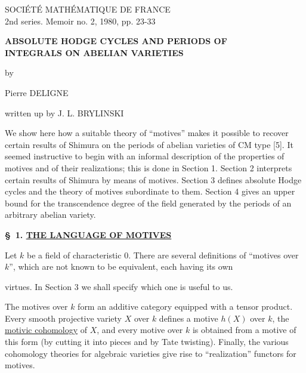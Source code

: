 \documentclass[10pt,a4paper]{article}
\begin{document}
\fontsize{8.65}{10.15}\selectfont
\sloppy

\begin{flushleft}\textsc{SOCIÉTÉ MATHÉMATIQUE DE FRANCE}\\
2nd series. Memoir no. 2, 1980, pp. 23-33
\end{flushleft}

\vspace{1.5em}
\begin{center}
{\bfseries ABSOLUTE HODGE CYCLES AND PERIODS OF\\[0.35em]
INTEGRALS ON ABELIAN VARIETIES}

\vspace{1.4em}
by

\vspace{1em}
Pierre DELIGNE

\vspace{0.5em}
written up by J. L. BRYLINSKI
\end{center}

\vspace{1em}
We show here how a suitable theory of ``motives'' makes it possible to recover certain results of Shimura on the periods of abelian varieties of CM type [5]. It seemed instructive to begin with an informal description of the properties of motives and of their realizations; this is done in Section 1. Section 2 interprets certain results of Shimura by means of motives. Section 3 defines absolute Hodge cycles and the theory of motives subordinate to them. Section 4 gives an upper bound for the transcendence degree of the field generated by the periods of an arbitrary abelian variety.

\vspace{0.8em}
\noindent\textbf{\S\ 1. \quad \uline{THE LANGUAGE OF MOTIVES}}

Let $k$ be a field of characteristic $0$. There are several definitions of ``motives over $k$'', which are not known to be equivalent, each having its own


\newpage


virtues. In Section 3 we shall specify which one is useful to us.

The motives over $k$ form an additive category equipped with a tensor product. Every smooth projective variety $X$ over $k$ defines a motive $h(X)$ over $k$, the \uline{motivic cohomology} of $X$, and every motive over $k$ is obtained from a motive of this form (by cutting it into pieces and by Tate twisting). Finally, the various cohomology theories for algebraic varieties give rise to ``realization'' functors for motives.
\end{document}
